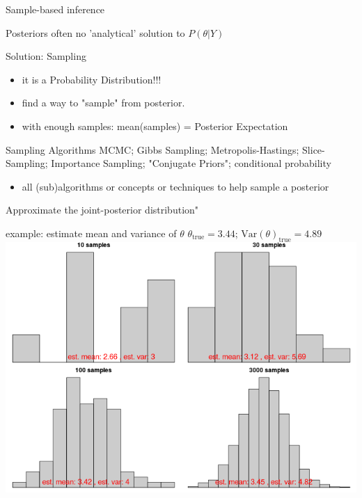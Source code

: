 \documentclass[presentation]{beamer}
\begin{document}
\begin{frame}[label=sec-29]{Sample-based inference}
\begin{block}{Posteriors}
often no 'analytical' solution to $P(\theta\vert Y)$
\end{block}

\begin{block}{Solution: Sampling}
\begin{itemize}
\item it is a Probability Distribution!!!
\item find a way to "sample" from posterior.
\item with enough samples: mean(samples) = Posterior Expectation
\end{itemize}
\end{block}

\begin{block}{Sampling Algorithms}
MCMC; Gibbs Sampling; Metropolis-Hastings; Slice-Sampling; Importance Sampling; "Conjugate Priors"; conditional probability
\begin{itemize}
\item all (sub)algorithms or concepts or techniques to help sample a posterior
\end{itemize}
\end{block}
\end{frame}
\begin{frame}[label=sec-30]{Approximate the joint-posterior distribution"}
\begin{block}{example: estimate mean and variance of $\theta$}
$\theta_{\text{true}}=3.44$; $\text{Var}(\theta)_{\text{true}}=4.89$
\includegraphics[width=.9\linewidth]{samples1.png}
\end{block}
\end{frame}
\end{document}
